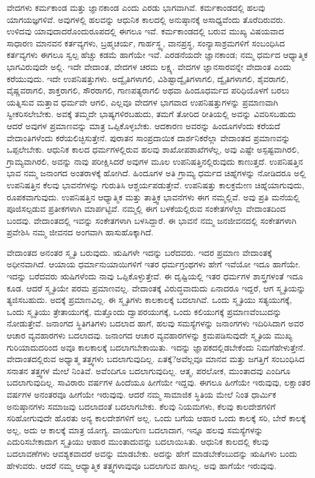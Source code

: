 ವೇದಗಳು ಕರ್ಮಕಾಂಡ ಮತ್ತು ಜ್ಞಾನಕಾಂಡ ಎಂದು ಎರಡು ಭಾಗವಾಗಿವೆ. ಕರ್ಮಕಾಂಡದಲ್ಲಿ ಹಲವು ಯಾಗಯಜ್ಞಗಳಿವೆ. ಅವುಗಳಲ್ಲಿ ಹಲವನ್ನು ಆಧುನಿಕ ಕಾಲದಲ್ಲಿ ಅನುಷ್ಠಾನಕ್ಕೆ ಅಸಾಧ್ಯವೆಂದು ತೊರೆದಿರುವರು. ಉಳಿದವು ಯಾವುದಾದರೊಂದು\break ರೂಪದಲ್ಲಿ ಈಗಲೂ ಇವೆ. ಕರ್ಮಕಾಂಡದಲ್ಲಿ ಬರುವ ಮುಖ್ಯ ವಿಷಯವಾದ ಸಾಧಾರಣ ಮಾನವನ ಕರ್ತವ್ಯಗಳು, ಬ್ರಹ್ಮಚರ್ಯ, ಗಾರ್ಹಸ್ಥ್ಯ, ವಾನಪ್ರಸ್ಥ, ಸಂನ್ಯಾಸಾಶ್ರಮಗಳಿಗೆ ಸಂಬಂಧಿಸಿದ ಕರ್ತವ್ಯಗಳು ಈಗಲೂ ಸ್ವಲ್ಪ ಹೆಚ್ಚು ಕಡಮೆ ಹಾಗೆಯೇ ಇವೆ. ಎರಡನೆಯದೇ ಜ್ಞಾನಕಾಂಡ; ನಮ್ಮ ಧರ್ಮದ ಆಧ್ಯಾತ್ಮಿಕ ಭಾಗವಿರುವುದೇ ಅಲ್ಲಿ. ಇದೇ ವೇದಾಂತ, ವೇದಗಳ ಚರಮ ಲಕ್ಷ್ಯ. ವೇದಗಳ ಜ್ಞಾನಸಾರವನ್ನೇ ವೇದಾಂತ ಎಂದು ಕರೆಯುವುದು. ಇದೇ ಉಪನಿಷತ್ತುಗಳು. ಅದ್ವೈತಿಗಳಾಗಲಿ, ವಿಶಿಷ್ಟಾದ್ವೈತಿಗಳಾಗಲಿ, ದ್ವೈತಿಗಳಾಗಲಿ, ಶೈವರಾಗಲಿ, ವೈಷ್ಣವರಾಗಲಿ, ಶಾಕ್ತರಾಗಲಿ, ಸೌರರಾಗಲಿ, ಗಾಣಪತ್ಯರಾಗಲಿ ಅಥವಾ ಹಿಂದೂಧರ್ಮದ ಪರಿಧಿಯೊಳಗೆ ಬರಲು ಯತ್ನಿಸುವ ಮತ್ತಾವ ಧರ್ಮವೇ ಆಗಲಿ, ಎಲ್ಲವೂ ವೇದಗಳ ಭಾಗವಾದ ಉಪನಿಷತ್ತುಗಳನ್ನು ಪ್ರಮಾಣವಾಗಿ ಸ್ವೀಕರಿಸಲೇಬೇಕು. ಅವಕ್ಕೆ ತಮ್ಮದೇ ಭಾಷ್ಯಗಳಿರಬಹುದು, ತಮಗೆ ತೋರಿದ ರೀತಿಯಲ್ಲಿ ಅವನ್ನು ವಿವರಿಸಬಹುದು ಆದರೆ ಅವುಗಳ ಪ್ರಮಾಣವನ್ನು ಮಾತ್ರ ಒಪ್ಪಿಕೊಳ್ಳಬೇಕು. ಆದಕಾರಣ ಅವರನ್ನು ಹಿಂದೂಗಳೆಂದು ಕರೆಯದೆ ವೇದಾಂತಿಗಳೆಂದು ಕರೆಯಲಿಚ್ಛಿಸುತ್ತೇನೆ. ಪುರಾತನ ಸಾಂಪ್ರದಾಯಿಕ ದಾರ್ಶನಿಕರೆಲ್ಲಾ ವೇದಾಂತದ ಪ್ರಮಾಣವನ್ನು ಒಪ್ಪಲೇಬೇಕು. ಆಧುನಿಕ ಕಾಲದ ಧರ್ಮಗಳಲ್ಲಿರುವ ಹಲವು ಶಾಖೋಪಶಾಖೆಗಳೆಲ್ಲ, ಅವು ಎಷ್ಟೇ ಅಸ್ಪಷ್ಟವಾಗಿರಲಿ, ಗ್ರಾಮ್ಯವಾಗಿರಲಿ, ಅವನ್ನು ನಾವು ಪರೀಕ್ಷಿಸಿದರೆ ಅವುಗಳ ಮೂಲ ಉಪನಿಷತ್ತಿನಲ್ಲಿರುವುದು ಕಾಣುತ್ತದೆ. ಉಪನಿಷತ್ತಿನ ಭಾವ ನಮ್ಮ ಜನಾಂಗದ ಅಂತರಾಳಕ್ಕೆ ಹೋಗಿದೆ. ಹಿಂದೂಗಳ ಅತಿ ಗ್ರಾಮ್ಯ ಧರ್ಮದ ಚಿಹ್ನೆಗಳನ್ನು ನೋಡಿದರೂ ಅಲ್ಲಿ ಉಪನಿಷತ್ತಿನ ಕೆಲವು ಭಾವನೆಗಳನ್ನು ಗುರುತಿಸಿ ಆಶ್ಚರ್ಯಪಡುತ್ತೇವೆ. ಉಪನಿಷತ್ತು ಕಾಲಕ್ರಮೇಣ ಚಿಹ್ನೆಯಾಗುವುದು, ರೂಪಕವಾಗುವುದು. ಉಪನಿಷತ್ತಿನ ಆಧ್ಯಾತ್ಮಿಕ ಮತ್ತು ತಾತ್ತ್ವಿಕ ಭಾವನೆಗಳು ಈಗ ನಮ್ಮಲ್ಲಿವೆ. ಅವು ಪ್ರತಿ ಮನೆಯಲ್ಲಿ ಪೂಜಿಸಲ್ಪಡುವ ಪ್ರತೀಕಗಳಾಗಿ ಮಾರ್ಪಟ್ಟಿವೆ. ನಮ್ಮಲ್ಲಿ ಈಗ ಬಳಕೆಯಲ್ಲಿರುವ ಸಂಕೇತಗಳೆಲ್ಲಾ ವೇದಾಂತದಿಂದ ಬಂದವು. ವೇದಾಂತದಲ್ಲಿ ಇವನ್ನು ಸಂಕೇತಗಳಾಗಿ ಬಳಸಿದ್ದಾರೆ. ಈ ಭಾವನೆ ನಮ್ಮ ಜನಜೀವನದಲ್ಲಿ ಸಂಕೇತಗಳಾಗಿ ಪ್ರವೇಶಿಸಿ ನಮ್ಮ ಜೀವನದ ಅಂಗವಾಗಿ ಹಾಸುಹೊಕ್ಕಾಗಿದೆ.

ವೇದಾಂತದ ಅನಂತರ ಸ್ಮೃತಿ ಬರುವುದು. ಋಷಿಗಳೇ ಇದನ್ನು ಬರೆದವರು. ಇದರ ಪ್ರಮಾಣ ವೇದಾಂತಕ್ಕೆ ಅಧೀನವಾಗಿದೆ. ಆಯಾಯ ಧರ್ಮಾನುಯಾಯಿಗಳಿಗೆ ಇತರ ಧರ್ಮಗ್ರಂಥಗಳು ಹೇಗೆ ಇವೆಯೋ ಇದೂ ಹಾಗೆಯೇ. ಇದನ್ನು ಬರೆದವರು ಋಷಿಗಳೆಂದು ನಾವು ಒಪ್ಪಿಕೊಳ್ಳುತ್ತೇವೆ. ಈ ದೃಷ್ಟಿಯಲ್ಲಿ ಇತರ ಧರ್ಮಗಳ ಶಾಸ್ತ್ರಗಳಂತೆ ಇದೂ ಕೂಡ. ಆದರೆ ಸ್ಮೃತಿಯೇ ಪರಮ ಪ್ರಮಾಣವಲ್ಲ. ವೇದಾಂತಕ್ಕೆ ವಿರುದ್ಧವಾದುದು ಏನಾದರೂ ಇದ್ದರೆ, ಆಗ ಸ್ಮೃತಿಯನ್ನು ತ್ಯಜಿಸಬಹುದು. ಅದಕ್ಕೆ ಪ್ರಮಾಣವಿಲ್ಲ. ಈ ಸ್ಮೃತಿಗಳು ಕಾಲಕಾಲಕ್ಕೆ ಬದಲಾಗಿವೆ. ಒಂದು ಸ್ಮೃತಿಯು ಸತ್ಯಯುಗಕ್ಕೆ, ಒಂದು ಸ್ಮೃತಿಯು ತ್ರೇತಾಯುಗಕ್ಕೆ, ಮತ್ತೊಂದು ದ್ವಾಪರಯುಗಕ್ಕೆ, ಒಂದು ಕಲಿಯುಗಕ್ಕೆ ಪ್ರಮಾಣವೆಂಬುದನ್ನು ನೋಡುತ್ತೇವೆ. ಜನಾಂಗದ ಸ್ಥಿತಿಗತಿಗಳು ಬದಲಾದ ಹಾಗೆ, ಹಲವು ಸಮಸ್ಯೆಗಳನ್ನು ಜನಾಂಗಗಳು ಇದಿರಿಸಿದಾಗ ಅವರ ಆಚಾರ ವ್ಯವಹಾರಗಳು ಬದಲಾದವು. ಜನಾಂಗದ ಆಚಾರ ವ್ಯವಹಾರಗಳನ್ನು ಕ್ರಮಪಡಿಸುವುದೇ ಸ್ಮೃತಿಯ ಮುಖ್ಯ ಗುರಿಯಾದುದರಿಂದ ಅವೂ ಕಾಲಕಾಲಕ್ಕೆ ಬದಲಾಗಬೇಕಾಯಿತು. ಇದನ್ನು ಜ್ಞಾಪಕದಲ್ಲಿಡಬೇಕೆಂದು ನಿಮಗೆ\break ಹೇಳುತ್ತೇನೆ. ವೇದಾಂತದಲ್ಲಿರುವ ಅಧ್ಯಾತ್ಮ ತತ್ತ್ವಗಳು ಬದಲಾಗುವುದಿಲ್ಲ. ಏತಕ್ಕೆ?\break ಅವೆಲ್ಲವೂ ಮಾನವ ಮತ್ತು ಜಗತ್ತಿಗೆ ಸಂಬಂಧಿಸಿದ ಸನಾತನ ತತ್ತ್ವಗಳ ಮೇಲೆ ನಿಂತಿವೆ. ಅವೆಂದಿಗೂ ಬದಲಾಗುವುದಿಲ್ಲ. ಆತ್ಮ, ಪರಲೋಕ, ಮುಂತಾದವು ಎಂದಿಗೂ ಬದಲಾಗುವುದಿಲ್ಲ. ಸಾವಿರಾರು ವರ್ಷಗಳ ಹಿಂದೆಯೂ ಹೀಗೆಯೇ ಇದ್ದವು. ಈಗಲೂ ಹೀಗೆಯೇ ಇರುವುವು, ಲಕ್ಷಾಂತರ ವರ್ಷಗಳ ಅನಂತರವೂ ಹೀಗೆಯೇ ಇರುವುವು. ಆದರೆ ನಮ್ಮ ಸಾಮಾಜಿಕ ಸ್ಥಿತಿಯ ಮೇಲೆ ನಿಂತ ಧಾರ್ಮಿಕ ಅನುಷ್ಠಾನಗಳು ಸಮಾಜವು ಬದಲಾದಂತೆ ಬದಲಾಗಬೇಕು. ಕೆಲವು ನಿಯಮಗಳು, ಕೆಲವು ಕಾಲದೇಶಗಳಿಗೆ ಸರಿಹೋಗುವುದೇ ಹೊರತು ಅನ್ಯ ಕಾಲದೇಶಗಳಿಗೆ ಅಲ್ಲ. ಒಂದು ಬಗೆಯ ಆಹಾರ ಒಂದು ಕಾಲಕ್ಕೆ ಸರಿ, ಬೇರೆ ಕಾಲಕ್ಕೆ ಅಲ್ಲ, ಅದು ಆ ಕಾಲಕ್ಕೆ ಮಾತ್ರ ಯೋಗ್ಯ. ವಾಯುಗುಣ ಬದಲಾದಾಗ, ಇನ್ನೂ ಹಲವು ಸಮಸ್ಯೆಗಳನ್ನು ಎದುರಿಸಬೇಕಾದಾಗ ಸ್ಮೃತಿಯು ಆಹಾರ ಮುಂತಾದುವನ್ನು ಬದಲಾಯಿಸಿತು. ಆಧುನಿಕ ಕಾಲದಲ್ಲಿ ಕೆಲವು ಬದಲಾವಣೆಗಳು ಆವಶ್ಯಕವಾದರೆ ಅವನ್ನು ಮಾಡಬೇಕು. ಅದನ್ನು ಹೇಗೆ ಮಾಡಬೇಕೆಂಬುದನ್ನು ಋಷಿಗಳು ಬಂದು ಹೇಳುವರು. ಆದರೆ ನಮ್ಮ ಆಧ್ಯಾತ್ಮಿಕ ತತ್ತ್ವಗಳಾವುವೂ ಬದಲಾಗುವ ಹಾಗಿಲ್ಲ. ಅವು ಹಾಗೆಯೇ ಇರುವುವು.

